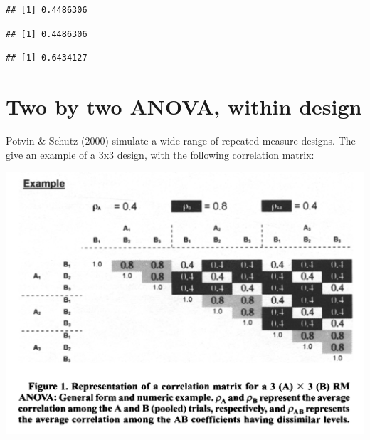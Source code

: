 \documentclass[]{book}
\newenvironment{Shaded}{\begin{snugshade}}{\end{snugshade}}
\newcommand{\CommentTok}[1]{\textcolor[rgb]{0.56,0.35,0.01}{\textit{#1}}}
\newcommand{\KeywordTok}[1]{\textcolor[rgb]{0.13,0.29,0.53}{\textbf{#1}}}
\newcommand{\NormalTok}[1]{#1}
\newcommand{\OperatorTok}[1]{\textcolor[rgb]{0.81,0.36,0.00}{\textbf{#1}}}
\newcommand{\StringTok}[1]{\textcolor[rgb]{0.31,0.60,0.02}{#1}}
\begin{document}
\begin{Shaded}
\end{Shaded}

\begin{verbatim}
## [1] 0.4486306
\end{verbatim}

\begin{Shaded}
\end{Shaded}

\begin{verbatim}
## [1] 0.4486306
\end{verbatim}

\begin{Shaded}
\end{Shaded}

\begin{verbatim}
## [1] 0.6434127
\end{verbatim}

\hypertarget{two-by-two-anova-within-design-1}{%
\section{Two by two ANOVA, within design}\label{two-by-two-anova-within-design-1}}

Potvin \& Schutz (2000) simulate a wide range of repeated measure designs. The give an example of a 3x3 design, with the following correlation matrix:

\includegraphics{screenshots/PS2000.png}
\end{document}
